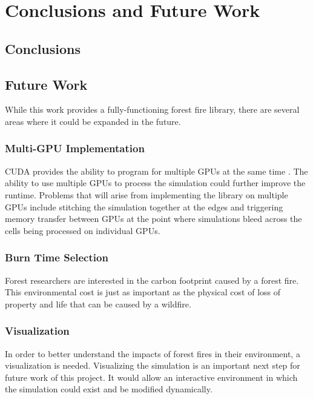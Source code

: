 \chapter{Conclusions and Future Work}
\label{chapter:conclusions}

\section{Conclusions}


\section{Future Work}
While this work provides a fully-functioning forest fire library, there are several areas where it could be expanded in the future. 

\subsection{Multi-GPU Implementation} 
CUDA provides the ability to program for multiple GPUs at the same time \cite{cuda}. The ability to use multiple GPUs to process the simulation could further improve the runtime. Problems that will arise from implementing the library on multiple GPUs include stitching the simulation together at the edges and triggering memory transfer between GPUs at the point where simulations bleed across the cells being processed on individual GPUs. 

\subsection{Burn Time Selection}
Forest researchers are interested in the carbon footprint caused by a forest fire. This environmental cost is just as important as the physical cost of loss of property and life that can be caused by a wildfire. 

\subsection{Visualization}
In order to better understand the impacts of forest fires in their environment, a visualization is needed. Visualizing the simulation is an important next step for future work of this project. It would allow an interactive environment in which the simulation could exist and be modified dynamically. 